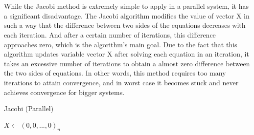 \documentclass[11pt]{article}       %
\begin{document}
\\
\\
While the Jacobi method is extremely simple to apply in a parallel system, it has a significant disadvantage. The Jacobi algorithm modifies the value of vector X in such a way that the difference between two sides of the equations decreases with each iteration. And after a certain number of iterations, this difference approaches zero, which is the algorithm's main goal. Due to the fact that this algorithm updates variable vector X after solving each equation in an iteration, it takes an excessive number of iterations to obtain a almost zero difference between the two sides of equations. In other words, this method requires too many iterations to attain convergence, and in worst case it becomes stuck and never achieves convergence for bigger systems\cite{appliedIterativeMethods}.
\begin{algorithm}
\DontPrintSemicolon 
{}
\caption{Jacobi (Parallel)}\label{alg:jacobi_parallel}
$X \gets (0,0,...,0)_n$\;
\end{algorithm}
\end{document}
